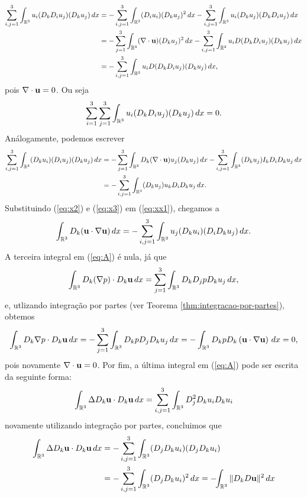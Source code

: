\begin{prf}
\[\begin{aligned}
            \sum_{i,j=1}^3 \int_{\mathbb{R}^3} u_i (D_k D_i u_j)(D_k u_j) \,dx &= -\sum_{i,j=1}^3 \int_{\mathbb{R}^3} (D_i u_i) (D_k u_j)^2 \,dx - \sum_{i,j=1}^{3} \int_{\mathbb{R}^3} u_i (D_k u_j) (D_k D_i u_j) \,dx\\
            &=-\sum_{j=1}^3 \int_{\mathbb{R}^3} (\nabla \cdot \mathbf{u}) (D_k u_j)^2 \,dx - \sum_{i,j=1}^3 \int_{\mathbb{R}^3} u_i D(D_k D_i u_j) (D_k u_j) \,dx\\
            &=- \sum_{i,j=1}^3 \int_{\mathbb{R}^3} u_i D(D_k D_i u_j) (D_k u_j) \,dx,
        \end{aligned}
    \]
    pois $\nabla \cdot \mathbf{u} = 0$. Ou seja
    \begin{equation} \label{eq:x2}
        \sum_{i=1}^3 \sum_{j=1}^{3} \int_{\mathbb{R}^3} u_i (D_k D_i u_j) (D_k u_j) \,dx = 0.
    \end{equation}
    Análogamente, podemos escrever
    \begin{align}
        \sum_{i,j=1}^3 \int_{\mathbb{R}^3} (D_k u_i) (D_i u_j) (D_k u_j) \,dx &= -\sum_{j=1}^{3} \int_{\mathbb{R}^3} D_k (\nabla \cdot \mathbf{u}) u_j (D_k u_j) \,dx - \sum_{i,j=1}^3 \int_{\mathbb{R}^3} (D_k u_j) I_k D_i D_k u_j \,dx \nonumber\\
        &= - \sum_{i,j=1}^3 \int_{\mathbb{R}^3} (D_k u_j) u_k D_i D_k u_j \,dx. \label{eq:x3}
    \end{align}
    Substituindo (\ref{eq:x2}) e (\ref{eq:x3}) em (\ref{eq:xx1}), chegamos a
    \[
        \int_{\mathbb{R}^3} D_k(\mathbf{u} \cdot \nabla \mathbf{u}) \,dx = - \sum_{i,j=1}^{3} \int_{\mathbb{R}^3} u_j (D_k u_i) (D_i D_k u_j) \,dx.
    \]
    A terceira integral em (\ref{eq:A}) é nula, já que
    \[
        \int_{\mathbb{R}^3} D_k (\nabla p) \cdot D_k \mathbf{u} \,dx = \sum_{j=1}^{3} \int_{\mathbb{R}^3} D_k D_j p D_k u_j \,dx,
    \]
    e, utlizando integração por partes (ver Teorema \ref{thm:integracao-por-partes}), obtemos
    \[
        \int_{\mathbb{R}^3} D_k \nabla p \cdot D_k \mathbf{u} \,dx = -\sum_{j=1}^3 \int_{\mathbb{R}^3} D_k p D_j D_k  u_j \,dx = - \int_{\mathbb{R}^3} D_k p D_k \left( \mathbf{u} \cdot \nabla \mathbf{u} \right) \,dx = 0,
    \]
    pois novamente $\nabla \cdot \mathbf{u} = 0$.
    Por fim, a última integral em (\ref{eq:A}) pode ser escrita da seguinte forma:
    \[
        \int_{\mathbb{R}^3} \Delta D_k \mathbf{u} \cdot D_k \mathbf{u} \,dx = \sum_{i,j=1}^3 \int_{\mathbb{R}^3} D_j^2 D_k u_i D_k u_i 
    \]
    novamente utilizando integração por partes, concluimos que
    \[
        \begin{aligned}
            \int_{\bR^3} \Delta D_k \bu \cdot D_k \bu \,dx &= -\sum_{i,j=1}^3 \int_{\bR^3} (D_jD_k u_i)(D_jD_k u_i)\\ 
            &= -\sum_{i,j=1}^3  \int_{\bR^3} (D_j D_k u_i)^2 \,dx = -\!\!\int_{\bR^3} \Vert D_kD\bu \Vert^2 \,dx

\end{aligned}\]
\end{prf}
